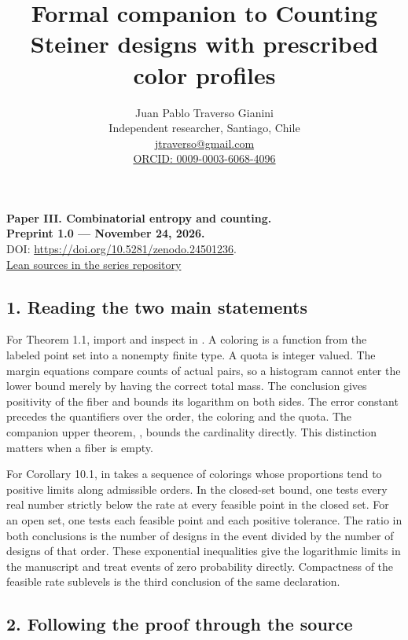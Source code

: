 \documentclass[english,11pt,a4paper]{article}
\title{Formal companion to Counting Steiner designs with prescribed color profiles}
\author{Juan Pablo Traverso Gianini\\\small Independent researcher, Santiago, Chile\\\small \href{mailto:jtraverso@gmail.com}{jtraverso@gmail.com}\\\small \href{https://orcid.org/0009-0003-6068-4096}{ORCID: 0009-0003-6068-4096}}\date{}
\newcounter{none}
\begin{document}
\raggedbottom\maketitle
\begin{center}
\textbf{Paper III. Combinatorial entropy and counting.}\\
\textbf{Preprint 1.0 --- November 24, 2026.}\\
DOI: \url{https://doi.org/10.5281/zenodo.24501236}.\\
\href{https://github.com/jtraverso/latinon-entropy-ldp/tree/main/preprints/STEINER-PROFILES/05_formalization/lean}{Lean sources in the series repository}\end{center}
\subsection{1. Reading the two main statements}\label{reading-the-two-main-statements}

For Theorem 1.1, import  and inspect  in . A coloring is a function from the labeled point set into a nonempty finite type. A quota is integer valued. The margin equations compare counts of actual pairs, so a histogram cannot enter the lower bound merely by having the correct total mass. The conclusion gives positivity of the fiber and bounds its logarithm on both sides. The error constant precedes the quantifiers over the order, the coloring and the quota. The companion upper theorem, , bounds the cardinality directly. This distinction matters when a fiber is empty.

For Corollary 10.1,  in  takes a sequence of colorings whose proportions tend to positive limits along admissible orders. In the closed-set bound, one tests every real number strictly below the rate at every feasible point in the closed set. For an open set, one tests each feasible point and each positive tolerance. The ratio in both conclusions is the number of designs in the event divided by the number of designs of that order. These exponential inequalities give the logarithmic limits in the manuscript and treat events of zero probability directly. Compactness of the feasible rate sublevels is the third conclusion of the same declaration.

\subsection{2. Following the proof through the source}\label{following-the-proof-through-the-source}
\end{document}
